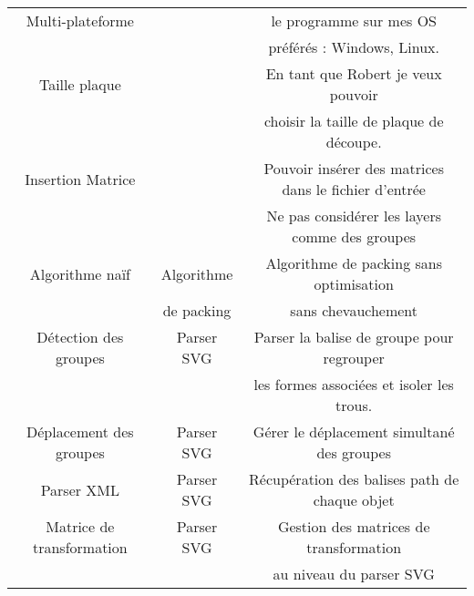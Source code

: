 \begin{table}[H]
{\begin{tabular}{|c|c|c|}
                        Multi-plateforme  && le programme sur mes OS \\
                        &&préférés : Windows, Linux. \\ \hline
                        Taille plaque && En tant que Robert je veux pouvoir \\
                        && choisir la taille de plaque de découpe. \\ \hline
                        Insertion Matrice && Pouvoir insérer des matrices dans le fichier d'entrée \\ \hline
                        && Ne pas considérer les layers comme des groupes \\ \hline
                        Algorithme naïf & Algorithme &  Algorithme de packing sans optimisation \\
                        &  de packing & sans chevauchement \\ \hline
                        Détection des groupes & Parser SVG & Parser la balise de groupe pour regrouper\\
                        && les formes associées et isoler les trous. \\ \hline
                        Déplacement des groupes & Parser SVG & Gérer le déplacement simultané des groupes \\ \hline
                        Parser XML & Parser SVG & Récupération des balises path de chaque objet \\ \hline
                        Matrice de transformation & Parser SVG & Gestion des matrices de transformation \\
                        && au niveau du parser SVG \\ \hline
                        
                                               
\end{tabular}}
\end{table}


